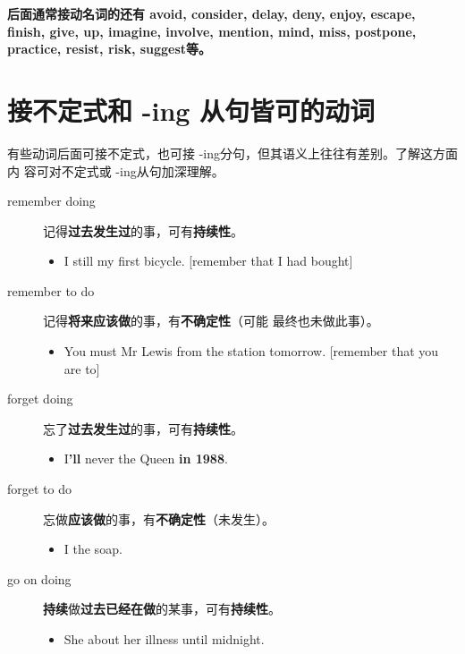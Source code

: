 \textbf{后面通常接动名词的还有 avoid, consider, delay, deny, enjoy,
  escape, finish, give, up, imagine, involve, mention, mind, miss, postpone,
  practice, resist, risk, suggest等。}



\section{接不定式和 -ing 从句皆可的动词}

有些动词后面可接不定式，也可接 -ing分句，但其语义上往往有差别。了解这方面内
容可对不定式或 -ing从句加深理解。

\begin{description}
\item[remember doing] 记得\textbf{过去发生过}的事，可有\textbf{持续性}。
  \begin{itemize}
  \item I still  my first bicycle. [remember that I
    had bought]
  \end{itemize}

\item[remember to do] 记得\textbf{将来应该做}的事，有\textbf{不确定性}（可能
  最终也未做此事）。
  \begin{itemize}
  \item You must  Mr Lewis from the station tomorrow. [remember
    that you are to]
  \end{itemize}

\item[forget doing] 忘了\textbf{过去发生过}的事，可有\textbf{持续性}。
  \begin{itemize}
  \item I\textbf{'ll} never  the Queen \textbf{in 1988}.
  \end{itemize}

\item[forget to do] 忘做\textbf{应该做}的事，有\textbf{不确定性}（未发生）。
  \begin{itemize}
  \item I  the soap.
  \end{itemize}


\item[go on doing] \textbf{持续}做\textbf{过去已经在做}的某事，可有\textbf{持续性}。
  \begin{itemize}
  \item She  about her illness until midnight.
  \end{itemize}


\end{description}
